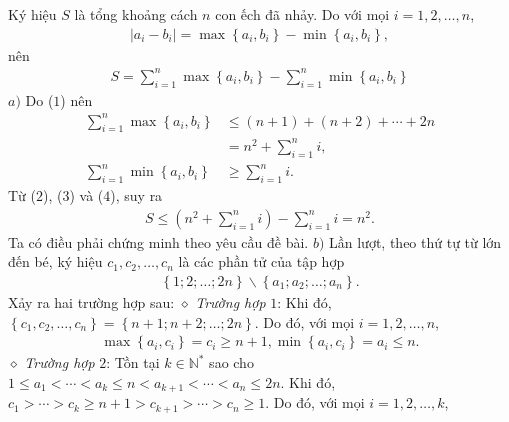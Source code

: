 \begin{multicols}{2}
	\vskip 0.05cm 
	Ký hiệu $S$ là tổng khoảng cách $n$ con ếch đã nhảy. Do với mọi $i = 1, 2, \ldots , n$,
	\begin{align*}
		\left| {{a_i} - {b_i}} \right| = \max \left\{ {{a_i},{b_i}} \right\} - \min \left\{ {{a_i},{b_i}} \right\},
	\end{align*}
	nên
	\begin{align*}
		S = \sum\limits_{i = 1}^n {\max \left\{ {{a_i},{b_i}} \right\}}  - \sum\limits_{i = 1}^n {\min \left\{ {{a_i},{b_i}} \right\}}  \tag{$2$}
	\end{align*}
	$a)$ Do ($1$) nên
	\begin{align*}
		\sum\limits_{i = 1}^n {\max \left\{ {{a_i},{b_i}} \right\}}  &\!\le\! \left( {n \!+\! 1} \right) \!+\! \left( {n \!+\! 2} \right) \!+\!  \cdots  \!+\! 2n \\[-1.2ex]
		&= {n^2} + \sum\limits_{i = 1}^n i,  \tag{$3$}\\[-1ex]
	\sum\limits_{i = 1}^n {\min \left\{ {{a_i},{b_i}} \right\}}  &\ge \sum\limits_{i = 1}^n i. \tag{$4$}
\end{align*}
	Từ ($2$), ($3$) và ($4$), suy ra
	\begin{align*}
		S \le \left( {{n^2} + \sum\limits_{i = 1}^n i } \right) - \sum\limits_{i = 1}^n i  = {n^2}.
	\end{align*}
	Ta có điều phải chứng minh theo yêu cầu đề bài.
	\vskip 0.05cm
	$b)$ Lần lượt, theo thứ tự từ lớn đến bé, ký hiệu ${c_1},{c_2}, \ldots ,{c_n}$  là các phần tử của tập hợp
	\begin{align*}
		\left\{ {1;2; \ldots ;2n} \right\}\backslash \left\{ {{a_1};{a_2}; \ldots ;{a_n}} \right\}.
	\end{align*}
	Xảy ra hai trường hợp sau:
	\vskip 0.05cm
	$\diamond$ \textit{Trường hợp} $1$:
	\vskip 0.05cm  
	Khi đó, $\left\{ {{c_1},{c_2}, \ldots ,{c_n}} \right\} \!=\! \left\{ {n \!+\! 1;n \!+\! 2; \ldots ;2n} \right\}\!.$  Do đó, với mọi $i = 1, 2, \ldots, n$,
	\begin{align*}
		\max \!\left\{\! {{a_i},{c_i}} \!\right\} \!=\! {c_i} \!\ge\! n \!+\! 1, \min\! \left\{\! {{a_i},{c_i}} \!\right\} \!=\! {a_i} \!\le\! n.
	\end{align*}
	$\diamond$ \textit{Trường hợp} $2$: Tồn tại $k \in \mathbb{N^*}$  sao cho  $1 \le {a_1} <  \cdots  < {a_k} \le n < {a_{k + 1}} <  \cdots  < {a_n} \le 2n.$ 
	\vskip 0.05cm
	Khi đó, ${c_1} >  \cdots  > {c_k} \ge n + 1 > {c_{k + 1}} >  \cdots  > {c_n} \ge 1.$ 
	\vskip 0.05cm
	Do đó, với mọi $i = 1, 2, \ldots , k$,
	\begin{align*}

\end{align*}
\end{multicols}
